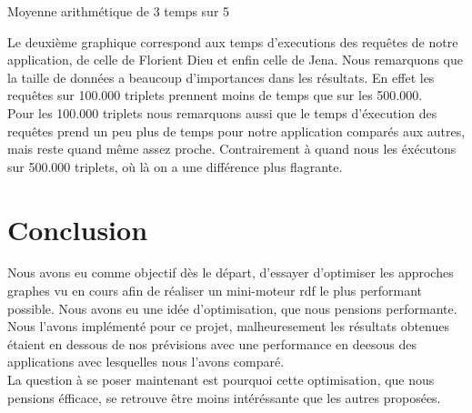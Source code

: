 \documentclass[12pt]{report}
\begin{document}
\begin{figure}[h]
  \centering
\end{figure}
\begin{center}
  \color{blue} Moyenne arithmétique de 3 temps sur 5
\end{center}
Le deuxième graphique correspond aux temps d'executions des requêtes de notre application, de celle de Florient Dieu et enfin celle de Jena. Nous remarquons que  la taille de données a beaucoup d'importances dans les résultats. En effet les requêtes sur 100.000 triplets prennent moins de temps que sur les 500.000.\\
Pour les 100.000 triplets nous remarquons aussi que le temps d'éxecution des requêtes prend un peu plus de temps pour notre application comparés aux autres, mais reste quand même assez proche. Contrairement à quand nous les éxécutons sur 500.000 triplets, où là on a une différence plus flagrante.
\section{Conclusion}
Nous avons eu comme objectif dès le départ, d'essayer d'optimiser les approches graphes vu en cours afin de réaliser un mini-moteur rdf le plus performant possible. Nous avons eu une idée d'optimisation, que nous pensions performante. Nous l'avons implémenté pour ce projet, malheuresement les résultats obtenues étaient en dessous de nos prévisions avec une performance en deesous des applications avec lesquelles nous l'avons comparé.\\
La question à se poser maintenant est pourquoi cette optimisation, que nous pensions éfficace, se retrouve être moins intéréssante que les autres proposées. 
\end{document}
